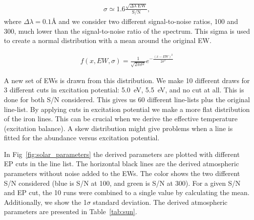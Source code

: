 \documentclass{aa}
\begin{document}
\begin{align}
    \sigma \simeq 1.6 \frac{\sqrt{\Delta\lambda\; \mathrm{EW}}}{\mathrm{S/N}},
\end{align}
where $\Delta\lambda=0.1\si{\angstrom}$ and we consider two different
signal-to-noise ratios, 100 and 300, much lower than the signal-to-noise
ratio of the spectrum. This sigma is used to create a normal
distribution with a mean around the original EW.

\begin{align}
    f(x, EW, \sigma) = \frac{1}{\sqrt{2\pi\sigma^2}} e^{-\frac{(x-EW)^2}{2\sigma^2}}
\end{align}

A new set of EWs is drawn from this distribution. We make 10 different
draws for 3 different cuts in excitation potential: \SI{5.0}{eV},
\SI{5.5}{eV}, and no cut at all. This is done for both S/N considered.
This gives us 60 different line-lists plus the original line-list. By
applying cuts in excitation potential we make a more flat distribution
of the iron lines. This can be crucial when we derive the effective
temperature (excitation balance). A skew distribution might give
problems when a line is fitted for the abundance versus excitation
potential.

In Fig~\ref{fig:solar_parameters} the derived parameters are plotted
with different EP cuts in the line list. The horizontal black lines
are the derived atmospheric parameters without noise added to the EWs.
The color shows the two different S/N considered (blue is S/N at 100,
and green is S/N at 300). For a given S/N and EP cut, the 10 runs were
combined to a single value by calculating the mean. Additionally,
we show the 1$\sigma$ standard deviation. The derived atmospheric
parameters are presented in Table~\ref{tab:sun}.
\end{document}
